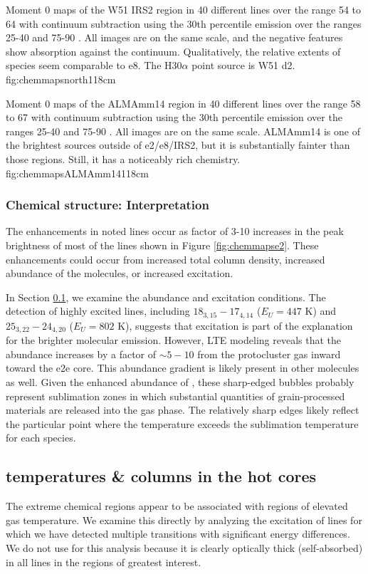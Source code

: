 \documentclass{aa}
\begin{document}
{Moment 0 maps of the W51 IRS2 region in 40 different lines over the range 54 to 64
\kms with continuum subtraction using the 30th percentile emission
over the ranges 25-40 and 75-90 \kms.  All images are on the same scale, and
the negative features show absorption against the continuum.  Qualitatively,
 the relative extents of species seem comparable to e8.  The H30$\alpha$ 
 point source is W51 d2.
}{fig:chemmapsnorth}{1}{18cm}

{Moment 0 maps of the ALMAmm14 region in 40 different lines over the range 58 to 67
\kms with continuum subtraction using the 30th percentile emission
over the ranges 25-40 and 75-90 \kms.  All images are on the same scale. 
ALMAmm14 is one of the brightest sources outside of e2/e8/IRS2, but
it is substantially fainter than those regions.  Still, it has a noticeably
rich chemistry.
}{fig:chemmapsALMAmm14}{1}{18cm}

\subsubsection{Chemical structure: Interpretation}
\label{sec:cheminterp}
The enhancements in noted lines occur as factor of 3-10 increases in the peak
brightness of most of the lines shown in Figure \ref{fig:chemmapse2}.  These
enhancements could occur from increased total column density, increased
abundance of the molecules, or increased excitation.

In Section \ref{sec:ch3ohtem}, we examine the \methanol abundance
and excitation conditions. 
The detection of highly excited \methanol lines, including
$18_{3,15}-17_{4,14}$ ($E_U=447$ K) and $25_{3,22}-24_{4,20}$ ($E_U=802$ K),
suggests that excitation is part of the explanation for the brighter
molecular emission.  However, LTE modeling reveals that the \methanol abundance
increases by a factor of $\sim5-10$ from the protocluster gas inward toward the
e2e core.  This abundance gradient is likely present in other molecules as
well.  Given the enhanced abundance of \methanol, these sharp-edged bubbles
probably represent sublimation zones in which substantial quantities of
grain-processed materials are released into the gas phase.  The relatively
sharp edges likely reflect the particular point where the temperature exceeds
the sublimation temperature for each species.


\subsection{\methanol temperatures \& columns in the hot cores}
\label{sec:ch3ohtem}
The extreme chemical regions appear to be associated with regions of
elevated gas temperature.  We examine this directly by analyzing
the excitation of lines for which we have detected multiple transitions with
significant energy differences.  We do not use \formaldehyde for this analysis
because it is clearly optically thick (self-absorbed) in all lines in the
regions of greatest interest.
\end{document}
